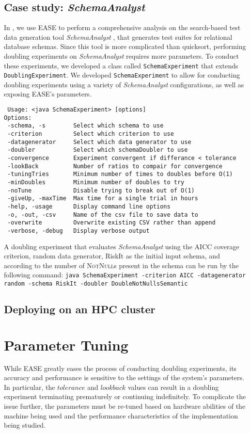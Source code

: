 \documentclass[10pt,twocolumn]{article}
\newcommand{\toolname}{{\sc EASE}\xspace}
\begin{document}
    \subsection{Case study: \textit{SchemaAnalyst}}
    In \cite{kinneer2015}, we use \toolname to perform a
    comprehensive analysis on the search-based test data generation 
    tool \textit{SchemaAnalyst} \cite{kapfhammer2013}, that generates
    test suites for relational database schemas. Since this tool is more
    complicated than quicksort, performing doubling experiments on
    \textit{SchemaAnalyst} requires more parameters.  To conduct these
    experiments, we developed a class called \texttt{SchemaExperiment}
    that extends \texttt{DoublingExperiment}.  We developed 
    \texttt{SchemaExperiment} to allow for conducting doubling
    experiments using a variety of \textit{SchemaAnalyst} configurations,
    as well as exposing \toolname's parameters.
{\scriptsize
\begin{verbatim}
 Usage: <java SchemaExperiment> [options]
Options:  
 -schema, -s        Select which schema to use 
 -criterion         Select which criterion to use 
 -datagenerator     Select which data generator to use 
 -doubler           Select which schemaDoubler to use 
 -convergence       Experiment convergent if differance < tolerance 
 -lookBack          Number of ratios to compair for convergence 
 -tuningTries       Minimum number of times to doubles before O(1)  
 -minDoubles        Minimum number of doubles to try 
 -noTune            Disable trying to break out of O(1) 
 -giveUp, -maxTime  Max time for a single trial in hours 
 -help, -usage      Display command line options 
 -o, -out, -csv     Name of the csv file to save data to 
 -overwrite         Overwrite existing CSV rather than append 
 -verbose, -debug   Display verbose output 
\end{verbatim}
}

    A doubling experiment that evaluates \textit{SchemaAnalyst} using
    the AICC coverage criterion, random data generator, RiskIt as the initial input
    schema, and according to the number of \textsc{NotNull}s present in the
    schema can be run by the following command:
    \texttt{java SchemaExperiment -criterion AICC -datagenerator random -schema RiskIt -doubler DoubleNotNullsSemantic}
    \subsection{Deploying on an HPC cluster}
\section{Parameter Tuning}
  While \toolname greatly eases the process of conducting
  doubling experiments, its accuracy and performance is
  sensitive to the settings of the system's parameters.  In particular,
  the $\mathit{tolerance}$ and $\mathit{lookback}$ values can result in
  a doubling experiment terminating prematurely or continuing
  indefinitely.
  To complicate the issue further, the parameters must be re-tuned based
  on hardware abilities of the machine being used and the performance
  characteristics of the implementation being studied.
\end{document}
